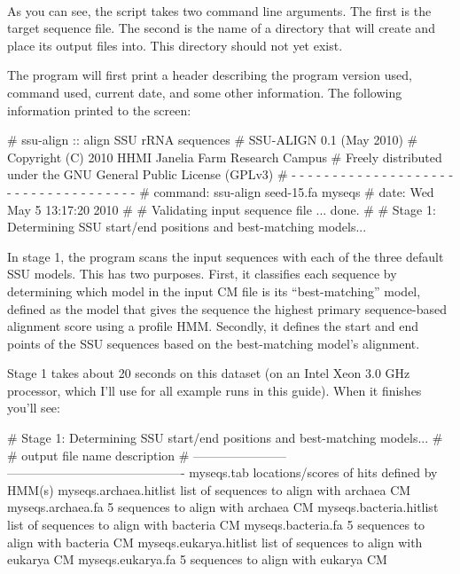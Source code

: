 \\

As you can see, the  script takes two command line
arguments. The first is the target sequence file. The second is the
name of a directory that  will create and place its
output files into. This directory should not yet exist. 

The program will first print a header describing the program version
used, command used, current date, and some other information. 
The following information printed to the screen:

\begin{sreoutput}
# ssu-align :: align SSU rRNA sequences
# SSU-ALIGN 0.1 (May 2010)
# Copyright (C) 2010 HHMI Janelia Farm Research Campus
# Freely distributed under the GNU General Public License (GPLv3)
# - - - - - - - - - - - - - - - - - - - - - - - - - - - - - - - - - - - -
# command: ssu-align seed-15.fa myseqs
# date:    Wed May  5 13:17:20 2010
#
# Validating input sequence file ... done.
#
# Stage 1: Determining SSU start/end positions and best-matching models...
\end{sreoutput}

In stage 1, the program scans the input sequences with each of the
three default SSU models. This has two purposes.  First, it classifies
each sequence by determining which model in the input CM file is its
``best-matching'' model, defined as
the model that gives the sequence the highest primary sequence-based
alignment score using a profile HMM. Secondly, it
defines the start and end points of the SSU sequences based on the
best-matching model's alignment.

Stage 1 takes about 20 seconds on this dataset (on an Intel Xeon 3.0
GHz processor, which I'll use for all example runs in this
guide). When it finishes you'll see: 

\begin{sreoutput}
# Stage 1: Determining SSU start/end positions and best-matching models...
#
# output file name         description                                
# -----------------------  -------------------------------------------
  myseqs.tab               locations/scores of hits defined by HMM(s)
  myseqs.archaea.hitlist   list of sequences to align with archaea CM
  myseqs.archaea.fa              5 sequences to align with archaea CM
  myseqs.bacteria.hitlist  list of sequences to align with bacteria CM
  myseqs.bacteria.fa             5 sequences to align with bacteria CM
  myseqs.eukarya.hitlist   list of sequences to align with eukarya CM
  myseqs.eukarya.fa              5 sequences to align with eukarya CM
\end{sreoutput}

